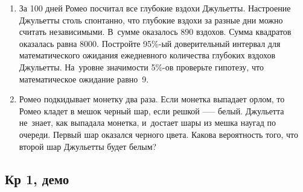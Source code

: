 \documentclass[12pt, a4paper]{article}\usepackage[]{graphicx}\usepackage[]{color}
\begin{document}
\begin{enumerate}
\item За 100 дней Ромео посчитал все глубокие вздохи Джульетты. Настроение Джульетты столь спонтанно, что глубокие вздохи за разные дни можно считать независимыми. В~сумме оказалось 890 вздохов. Сумма квадратов оказалась равна 8000. Постройте 95\%-ый доверительный интервал для математического ожидания ежедневного количества глубоких вздохов Джульетты. На~уровне значимости 5\%-ов проверьте гипотезу, что математическое ожидание равно~9.

\item Ромео подкидывает монетку два раза. Если монетка выпадает орлом, то Ромео кладет в мешок черный шар, если решкой --— белый. Джульетта не~знает, как выпадала монетка, и~достает шары из мешка наугад по очереди. Первый шар оказался черного цвета. Какова вероятность того, что второй шар Джульетты будет белым?

\end{enumerate}


\subsection{Кр 1, демо}







\end{document}
